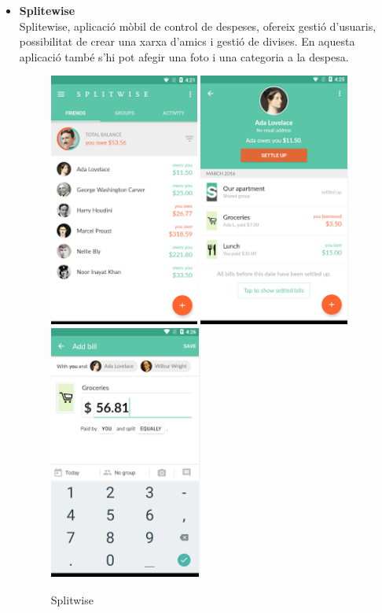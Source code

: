 \begin{itemize}
\begin{itemize}
\item{\textbf{Splitewise}}\\
Splitewise, aplicació mòbil de control de despeses, ofereix gestió d'usuaris, possibilitat de crear una xarxa d'amics i gestió de divises. En aquesta aplicació també s'hi pot afegir una foto i una categoria a la despesa.

\begin{figure}[!h]
\centering
\includegraphics[scale=0.90]{Figures/splitwise1.jpg}
\includegraphics[scale=0.90]{Figures/splitwise2.jpg}
\includegraphics[scale=0.90]{Figures/splitwise3.jpg}
\caption{Splitwise}
\end{figure}


\end{itemize}
\end{itemize}
